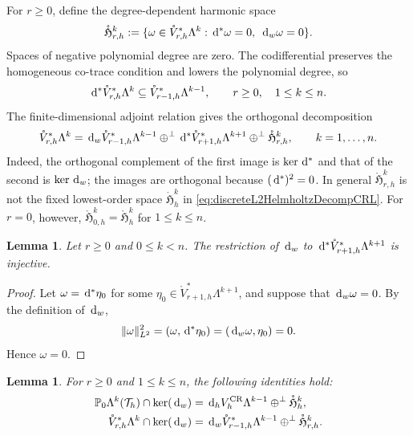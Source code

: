 \documentclass[10pt]{amsart}
\numberwithin{equation}{section}
\newtheorem{lemma}[theorem]{Lemma}
\newcommand{\dd}{\,{\rm d}}
\begin{document}
For $r\geq0$, define the degree-dependent harmonic space
\[
\mathring{\mathfrak H}_{r,h}^k
:=\{\omega\in\mathring V_{r,h}^{*}\Lambda^k:
       \dd^*\omega=0,\ \dd_w\omega=0\}.
\]
Spaces of negative polynomial degree are zero. The codifferential
preserves the homogeneous co-trace condition and lowers the polynomial
degree, so
\[
\dd^*\mathring V_{r,h}^{*}\Lambda^k
\subseteq\mathring V_{r-1,h}^{*}\Lambda^{k-1},
\qquad r\geq0,\quad 1\leq k\leq n.
\]
The finite-dimensional adjoint relation gives the orthogonal decomposition
\begin{equation}\label{eq:discreteL2hodgeDecomp}
\mathring{V}_{r,h}^{*}\Lambda^k
=
\dd_w \mathring{V}_{r-1,h}^{*}\Lambda^{k-1}
\oplus^{\perp}
\dd^*\mathring{V}_{r+1,h}^{*}\Lambda^{k+1}
\oplus^{\perp}
\mathring{\mathfrak H}_{r,h}^k,
\qquad k=1,\ldots,n .
\end{equation}
Indeed, the orthogonal complement of the first image is $\ker\dd^*$ and that of the second is $\ker\dd_w$; the images are orthogonal because $(\dd^*)^2=0$.
In general $\mathring{\mathfrak H}_{r,h}^k$ is not the fixed lowest-order space $\mathring{\mathfrak H}_h^k$ in \eqref{eq:discreteL2HelmholtzDecompCRL}.
For $r=0$, however, $\mathring{\mathfrak H}_{0,h}^k
=\mathring{\mathfrak H}_h^k$ for $1\leq k\leq n$.


\begin{lemma}
Let $r\geq0$ and $0\leq k<n$.
The restriction of $\dd_w$ to
$\dd^*\mathring{V}_{r+1,h}^{*}\Lambda^{k+1}$ is injective.
\end{lemma}
\begin{proof}
Let $\omega=\dd^*\eta_0$ for some
$\eta_0\in\mathring V_{r+1,h}^{*}\Lambda^{k+1}$, and suppose that
$\dd_w\omega=0$. By the definition of $\dd_w$,
\[
\|\omega\|_{L^2}^2
=(\omega,\dd^*\eta_0)
=(\dd_w\omega,\eta_0)=0.
\]
Hence $\omega=0$.
\end{proof}

\begin{lemma}
For $r\geq0$ and $1\leq k\leq n$, the following identities hold:
\begin{align}
\mathbb P_0\Lambda^k(\mathcal T_h)\cap\ker(\dd_w)
&=
\dd_h V_h^{\rm CR}\Lambda^{k-1}
\oplus^{\perp}
\mathring{\mathfrak H}_h^k,
\label{eq:P0kerweakd}
\\
\mathring{V}_{r,h}^{*}\Lambda^k\cap\ker(\dd_w)
&=
\dd_w \mathring{V}_{r-1,h}^{*}\Lambda^{k-1}
\oplus^{\perp}
\mathring{\mathfrak H}_{r,h}^k .
\label{eq:Vrstarkerweakd}
\end{align}
\end{lemma}
\end{document}
